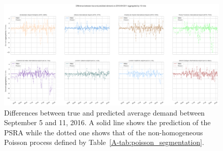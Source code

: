 \documentclass[draft,review]{elsarticle}
\begin{document}
\begin{figure}
    \includegraphics[width=\textwidth]{prediction_last_week}
    \caption{Differences between true and predicted average demand between September 5 and 11, 2016. A solid line shows the prediction of the \acs{PSRA} while the dotted one shows that of the non-homogeneous Poisson process defined by Table~\ref{A-tab:poisson_segmentation}.}
    \label{fig:pred_last_week}
\end{figure}
\end{document}
